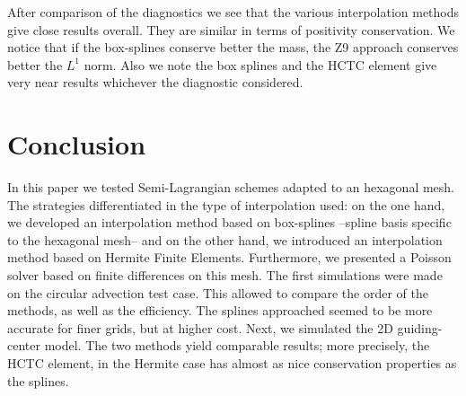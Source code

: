 \documentclass[proc]{edpsmath}
\begin{document}
After comparison of the diagnostics we see that the various interpolation methods give close results overall. They are similar in terms of positivity conservation. We notice that if the box-splines conserve better the mass, the Z9 approach conserves better the $L^1$ norm. Also we note the box splines and the HCTC element give very near results whichever the diagnostic considered.  


\section{Conclusion}
\label{sec:conclusion}
In this paper we tested  Semi-Lagrangian schemes adapted to an hexagonal mesh. The strategies differentiated in the type of interpolation used: on the one hand, we developed an interpolation method based on box-splines --spline basis specific to the hexagonal mesh-- and on the other hand, we introduced an interpolation method based on Hermite Finite Elements. Furthermore, we presented a Poisson solver based on finite differences on this mesh. The first simulations were made on the circular advection test case. This allowed to compare the order of the methods, as well as the efficiency. The splines approached seemed to be more accurate for finer grids, but at higher cost. Next, we simulated the 2D guiding-center model. The two methods yield comparable results; more precisely, the  HCTC element, in the Hermite case has almost as nice conservation properties as the splines.





\end{document}

